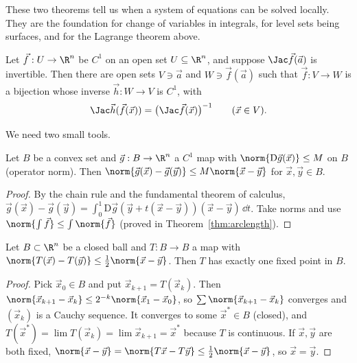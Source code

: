 These two theorems tell us when a system of equations can be solved locally. They are the foundation for change of variables in integrals, for level sets being surfaces, and for the Lagrange theorem above.

\begin{theorem}\label{thm:inverse}
Let $\vec f:U\to\R^n$ be $C^1$ on an open set $U\subseteq\R^n$, and suppose $\Jac\vec f(\vec a)$ is invertible. Then there are open sets $V\ni\vec a$ and $W\ni\vec f(\vec a)$ such that $\vec f:V\to W$ is a bijection whose inverse $\vec h:W\to V$ is $C^1$, with
\[
\Jac\vec h(\vec f(\vec x))=\bigl(\Jac\vec f(\vec x)\bigr)^{-1}\qquad(\vec x\in V).
\]
\end{theorem}

We need two small tools.

\begin{lemma}\label{lem:mvi}
Let $B$ be a convex set and $\vec g:B\to\R^n$ a $C^1$ map with $\norm{\mathrm{D}\vec g(\vec x)}\le M$ on $B$ (operator norm). Then $\norm{\vec g(\vec x)-\vec g(\vec y)}\le M\norm{\vec x-\vec y}$ for $\vec x,\vec y\in B$.
\end{lemma}

\begin{proof}
By the chain rule and the fundamental theorem of calculus, $\vec g(\vec x)-\vec g(\vec y)=\int_0^1\mathrm{D}\vec g(\vec y+t(\vec x-\vec y))(\vec x-\vec y)\,\dd t$. Take norms and use $\norm{\int\vec f}\le\int\norm{\vec f}$ (proved in Theorem~\ref{thm:arclength}).
\end{proof}

\begin{lemma}\label{lem:contraction}
Let $B\subset\R^n$ be a closed ball and $T:B\to B$ a map with $\norm{T(\vec x)-T(\vec y)}\le\tfrac12\norm{\vec x-\vec y}$. Then $T$ has exactly one fixed point in $B$.
\end{lemma}

\begin{proof}
Pick $\vec x_0\in B$ and put $\vec x_{k+1}=T(\vec x_k)$. Then $\norm{\vec x_{k+1}-\vec x_k}\le2^{-k}\norm{\vec x_1-\vec x_0}$, so $\sum\norm{\vec x_{k+1}-\vec x_k}$ converges and $(\vec x_k)$ is a Cauchy sequence. It converges to some $\vec x^*\in B$ (closed), and $T(\vec x^*)=\lim T(\vec x_k)=\lim\vec x_{k+1}=\vec x^*$ because $T$ is continuous. If $\vec x,\vec y$ are both fixed, $\norm{\vec x-\vec y}=\norm{T\vec x-T\vec y}\le\tfrac12\norm{\vec x-\vec y}$, so $\vec x=\vec y$.
\end{proof}

